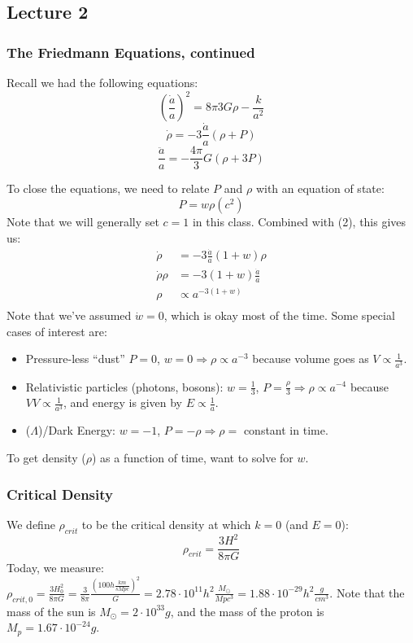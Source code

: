 \documentclass{article}
\def\imply{\Rightarrow}
\def\inv#1{\frac{1}{ #1}}
\def\aa{\frac{\dot a }{ a}}
\def\atow{a^{-3(1+w)}}
\def\imply{\Rightarrow}
\def\atow{a^{-3(1+w)}}
\def\paap{\left(\aa\right)}
\def\rcr{{\rho_{crit}}}
\begin{document}
\subsection{Lecture 2}

\subsubsection{ The Friedmann Equations, continued }

Recall we had the following equations:
$$\paap^2={8\pi}{3}G\rho-\frac{k}{ a^2}$$
$$\dot \rho=-3\aa(\rho+P)$$
$$\frac{\ddot a}{ a}=-\frac{4\pi}{3}G(\rho+3P)$$

To close the equations, we need to relate $P$ and $\rho$ with an equation of
state:
$$\boxed{P=w\rho(c^2)}$$ 
Note that we will generally set $c=1$ in this class.
Combined with (2), this gives us:
\begin{align}
\dot \rho&=-3\aa(1+w)\rho\\
{\dot \rho}{\rho}&=-3(1+w)\aa\\
\rho&\propto\atow\\
\end{align}
Note that we've assumed $\dot w=0$, which is okay most of the time.
Some special cases of interest are:
\begin{itemize}
\item Pressure-less ``dust'' $P=0$, $w=0\imply\rho\propto a^{-3}$ because volume
goes as $V\propto\inv{a^3}$.
\item Relativistic particles (photons, bosons): $w=\inv{3}$, $P=\frac{\rho}{3}
\imply\rho\propto a^{-4}$ because $VV\propto\inv{a^3}$, and energy is given
by $E\propto\inv{a}$.
\item  ($\Lambda$)/Dark Energy: $w=-1$, $P=-\rho\imply\rho=$ constant 
in time.
\end{itemize}
To get density ($\rho$) as a function of time, want to solve for $w$.

\subsubsection{ Critical Density}

We define $\rho_{crit}$ to be the critical density at which $k=0$ (and $E=0$):
\def\rcr{{\rho_{crit}}}
$$\rcr=\frac{3H^2}{8\pi G}$$
Today, we measure: $\rho_{crit,0}=\frac{3H_0^2}{8\pi G}= 
\frac{3}{8\pi}\frac{\left(100h\frac{km}{ sMpc}\right)^2}{ G}=2.78\cdot10^{11}h^2
\frac{M_\odot}{ Mpc^3}=1.88\cdot10^{-29}h^2\frac{g}{ cm^3}$.
Note that the mass of the sun is $M_\odot=2\cdot10^{33}g$, and
the mass of the proton is $M_p=1.67\cdot10^{-24}g$.
\end{document}
